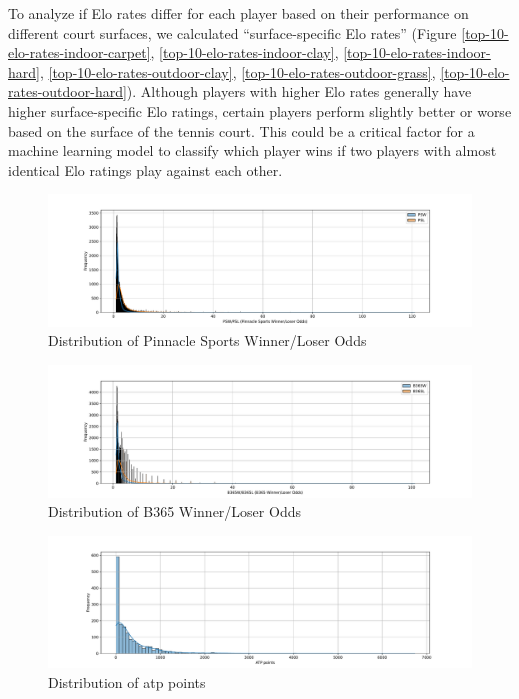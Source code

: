 \documentclass[preprint,aps,nofootinbib,a4paper,superscriptaddress,longbibliography,amsfonts,amssymb,amsmath,titlepage]{revtex4-2}
\begin{document}
To analyze if Elo rates differ for each player based on their performance on different court surfaces, we calculated ``surface-specific Elo rates'' (Figure \ref{top-10-elo-rates-indoor-carpet}, \ref{top-10-elo-rates-indoor-clay}, \ref{top-10-elo-rates-indoor-hard}, \ref{top-10-elo-rates-outdoor-clay}, \ref{top-10-elo-rates-outdoor-grass}, \ref{top-10-elo-rates-outdoor-hard}). Although players with higher Elo rates generally have higher surface-specific Elo ratings, certain players perform slightly better or worse based on the surface of the tennis court. This could be a critical factor for a machine learning model to classify which player wins if two players with almost identical Elo ratings play against each other.
%
\begin{figure}[h]
\includegraphics[width=\textwidth]{pictures/ps-odds-dist.pdf}
\caption{Distribution of Pinnacle Sports Winner/Loser Odds}
\label{ps-odds-dist}
\end{figure}
%
%
\begin{figure}[h]
\includegraphics[width=\textwidth]{pictures/b365-odds-dist.pdf}
\caption{Distribution of B365 Winner/Loser Odds}
\label{b365-odds-dist}
\end{figure}
%
%
\begin{figure}[h]
\includegraphics[width=\textwidth]{pictures/atp-point-dist.pdf}
\caption{Distribution of atp points}
\label{atp-point-dist}
\end{figure}
\end{document}

